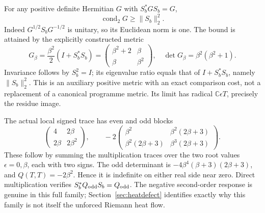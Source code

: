 \documentclass[11pt,a4paper]{article}
\theoremstyle{definition}\newtheorem{definition}[theorem]{Definition}\newtheorem{remark}[theorem]{Remark}
\newcommand{\C}{\mathbb C}\newcommand{\R}{\mathbb R}\newcommand{\Z}{\mathbb Z}\newcommand{\B}{\mathbb B}
\begin{document}
For any positive definite Hermitian $G$ with $S_b^*GS_b=G$,
\begin{equation}
 \operatorname{cond}_2G\ge\|S_b\|_2^2.                  \label{eq:metriclower}
\end{equation}
Indeed $G^{1/2}S_bG^{-1/2}$ is unitary, so its Euclidean norm is one. The bound is attained by the explicitly constructed metric
\begin{equation}
 G_\beta=\frac{\beta^2}{2}(I+S_b^*S_b)
 =\begin{pmatrix}\beta^2+2&\beta\\\beta&\beta^2\end{pmatrix},
 \quad\det G_\beta=\beta^2(\beta^2+1).                   \label{eq:optimalmetric}
\end{equation}
Invariance follows by $S_b^2=I$; its eigenvalue ratio equals that of $I+S_b^*S_b$, namely $\|S_b\|_2^2$. This is an auxiliary positive metric with an exact comparison cost, not a replacement of a canonical programme metric. Its limit has radical $\C\epsilon T$, precisely the residue image.

The actual local signed trace has even and odd blocks
\begin{equation}
 \begin{pmatrix}4&2\beta\\2\beta&2\beta^2\end{pmatrix},
 \qquad -2\begin{pmatrix}
 \beta^2&\beta^2(2\beta+3)\\
 \beta^2(2\beta+3)&\beta^3(2\beta+3)
 \end{pmatrix}.                                         \label{eq:localtrace}
\end{equation}
These follow by summing the multiplication traces over the two root values $\epsilon=0,\beta$, each with two signs. The odd determinant is $-4\beta^4(\beta+3)(2\beta+3)$, and $Q(T,T)=-2\beta^2$. Hence it is indefinite on either real side near zero. Direct multiplication verifies $S_b^*Q_{\rm odd}S_b=Q_{\rm odd}$. The negative second-order response is genuine in this full family; Section~\ref{sec:heatdefect} identifies exactly why this family is not itself the unforced Riemann heat flow.
\end{document}
